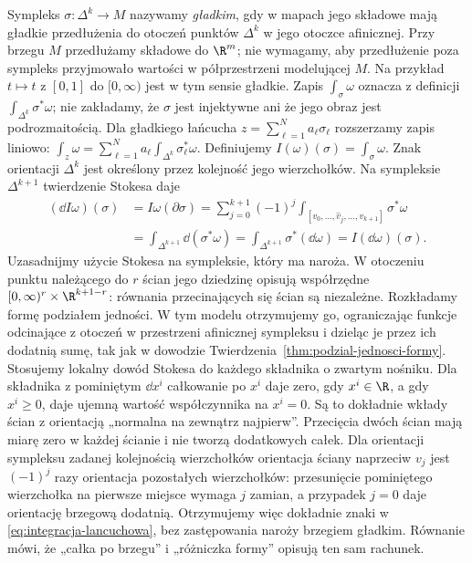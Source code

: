 Sympleks $\sigma:\Delta^k\to M$ nazywamy \emph{gładkim},
gdy w mapach jego składowe mają gładkie przedłużenia
do otoczeń punktów $\Delta^k$ w jego otoczce afinicznej.
Przy brzegu $M$ przedłużamy składowe do $\R^m$;
nie wymagamy, aby przedłużenie poza sympleks przyjmowało
wartości w półprzestrzeni modelującej $M$.
Na przykład $t\mapsto t$ z $[0,1]$ do $[0,\infty)$
jest w tym sensie gładkie. Zapis
$\int_\sigma\omega$ oznacza z definicji
$\int_{\Delta^k}\sigma^*\omega$; nie zakładamy, że $\sigma$
jest injektywne ani że jego obraz jest podrozmaitością.
Dla gładkiego łańcucha $z=\sum_{\ell=1}^N a_\ell\sigma_\ell$
rozszerzamy zapis liniowo:
$\int_z\omega=\sum_{\ell=1}^N a_\ell
\int_{\Delta^k}\sigma_\ell^*\omega$.
Definiujemy $I(\omega)(\sigma)=\int_\sigma\omega$.
Znak orientacji $\Delta^k$ jest określony przez
kolejność jego wierzchołków. Na sympleksie
$\Delta^{k+1}$ twierdzenie Stokesa daje
\begin{equation}\label{eq:integracja-lancuchowa}
 \begin{aligned}
 (\dd I\omega)(\sigma)
 &= I\omega(\partial\sigma)
  =\sum_{j=0}^{k+1}(-1)^j
      \int_{[v_0,\ldots,\widehat v_j,\ldots,v_{k+1}]}
          \sigma^*\omega \\
 &=\int_{\Delta^{k+1}}\dd(\sigma^*\omega)
  =\int_{\Delta^{k+1}}\sigma^*(\dd\omega)
  =I(\dd\omega)(\sigma).
 \end{aligned}
\end{equation}
Uzasadnijmy użycie Stokesa na sympleksie, który ma naroża.
W otoczeniu punktu należącego do $r$ ścian jego dziedzinę
opisują współrzędne
$[0,\infty)^r\times\R^{k+1-r}$: równania przecinających
się ścian są niezależne. Rozkładamy formę podziałem
jedności. W tym modelu otrzymujemy go, ograniczając
funkcje odcinające z otoczeń w przestrzeni afinicznej
sympleksu i dzieląc je przez ich dodatnią sumę,
tak jak w dowodzie Twierdzenia~\ref{thm:podzial-jednosci-formy}.
Stosujemy lokalny dowód Stokesa do każdego
składnika o zwartym nośniku. Dla składnika z pominiętym
$\dd x^i$ całkowanie po $x^i$ daje zero, gdy $x^i\in\R$,
a gdy $x^i\geq0$, daje ujemną wartość współczynnika
na $x^i=0$. Są to dokładnie wkłady ścian z orientacją
„normalna na zewnątrz najpierw”. Przecięcia dwóch ścian
mają miarę zero w każdej ścianie i nie tworzą dodatkowych
całek. Dla orientacji sympleksu zadanej kolejnością
wierzchołków orientacja ściany naprzeciw $v_j$ jest
$(-1)^j$ razy orientacja pozostałych wierzchołków:
przesunięcie pominiętego wierzchołka na pierwsze miejsce
wymaga $j$ zamian, a przypadek $j=0$ daje orientację
brzegową dodatnią. Otrzymujemy więc dokładnie znaki
w \eqref{eq:integracja-lancuchowa}, bez zastępowania
naroży brzegiem gładkim.
Równanie mówi, że „całka po brzegu” i „różniczka
formy” opisują ten sam rachunek.

